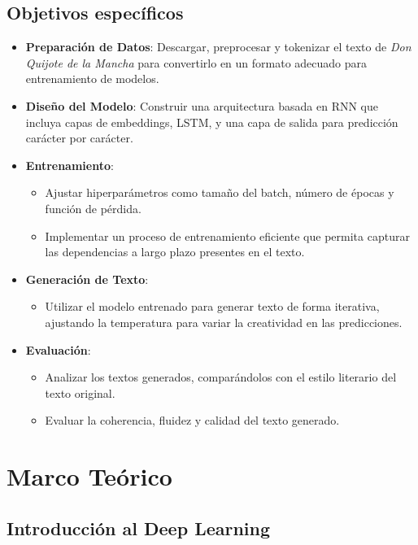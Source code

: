 \documentclass{article}
\begin{document}
\subsection{Objetivos específicos}

\begin{itemize}
    \item \textbf{Preparación de Datos}: Descargar, preprocesar y tokenizar el texto de \emph{Don Quijote de la Mancha} para convertirlo en un formato adecuado para entrenamiento de modelos.
    \item \textbf{Diseño del Modelo}: Construir una arquitectura basada en RNN que incluya capas de embeddings, LSTM, y una capa de salida para predicción carácter por carácter.
    \item \textbf{Entrenamiento}:
    \begin{itemize}
        \item Ajustar hiperparámetros como tamaño del batch, número de épocas y función de pérdida.
        \item Implementar un proceso de entrenamiento eficiente que permita capturar las dependencias a largo plazo presentes en el texto.
    \end{itemize}
    \item \textbf{Generación de Texto}:
    \begin{itemize}
        \item Utilizar el modelo entrenado para generar texto de forma iterativa, ajustando la temperatura para variar la creatividad en las predicciones.
    \end{itemize}
    \item \textbf{Evaluación}:
    \begin{itemize}
        \item Analizar los textos generados, comparándolos con el estilo literario del texto original.
        \item Evaluar la coherencia, fluidez y calidad del texto generado.
    \end{itemize}
\end{itemize}

\newpage

\section{Marco Teórico}
\subsection{Introducción al Deep Learning}
\end{document}
